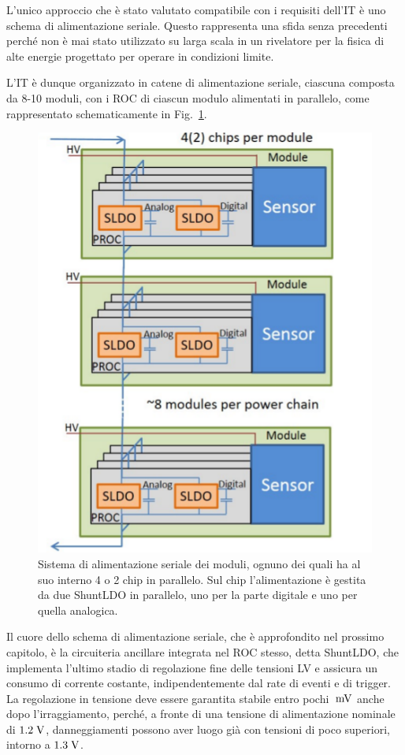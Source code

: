 L'unico approccio che \`e stato valutato compatibile con i requisiti dell'IT \`e uno schema di alimentazione seriale. Questo rappresenta una sfida senza precedenti perch\'e non \`e mai stato utilizzato su larga scala in un rivelatore per la fisica di alte energie progettato per operare in condizioni limite.

L'IT \`e dunque organizzato in catene di alimentazione seriale, ciascuna composta da 8-10 moduli, con i ROC di ciascun modulo alimentati in parallelo, come rappresentato schematicamente in Fig.~\ref{serial}. 
\begin{figure}
\centering
\includegraphics[scale=0.4]{Immagini/serial}
\caption{Sistema di alimentazione seriale dei moduli, ognuno dei quali ha al suo interno 4 o 2 chip in parallelo. Sul chip l'alimentazione è gestita da due ShuntLDO in parallelo, uno per la parte digitale e uno per quella analogica.}
\label{serial}
\end{figure}
Il cuore dello schema di alimentazione seriale, che \`e approfondito nel prossimo capitolo, \`e la circuiteria ancillare integrata nel ROC stesso, detta ShuntLDO, che implementa l'ultimo stadio di regolazione fine delle tensioni LV e assicura un consumo di corrente costante, indipendentemente dal rate di eventi e di trigger. La regolazione in tensione deve essere garantita stabile entro pochi $\rm \; mV$ anche dopo l'irraggiamento, perch\'e, a fronte di una tensione di alimentazione nominale di $1.2\rm \; V$, danneggiamenti possono aver luogo gi\`a con tensioni di poco superiori, intorno a $1.3\rm \; V$.

